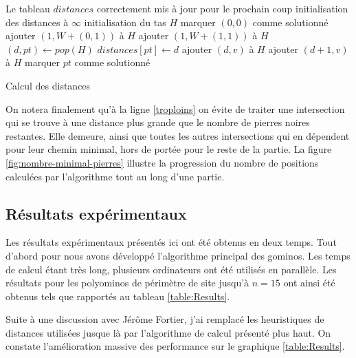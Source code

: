 \begin{algorithm}
\fontsize{10}{10}\selectfont
\begin{algorithmic}[1]
\Ensure Le tableau $distances$ correctement mis à jour pour le prochain coup
\State initialisation des distances à $\infty$
\State initialisation du tas $H$
\State marquer $(0,0)$ comme solutionné
\State ajouter $(1, W+(0,1))$ à $H$
\State ajouter $(1, W+(1,1))$ à $H$
	\State $(d, pt) \gets pop(H)$ \label{pop}
		\State $distances[pt] \gets d$
				\State ajouter $(d, v)$ à $H$
			\label{troploins}
				\State ajouter $(d+1, v)$ à $H$
			\EndIf
		\EndFor
		\State marquer $pt$ comme solutionné
	\EndIf
\EndWhile
\EndProcedure
\end{algorithmic}
\caption{Calcul des distances}\label{algo:calcul-des-distances}
\end{algorithm}


On notera finalement qu'à la ligne \ref{troploins} on évite de traiter une intersection qui se trouve à une distance plus grande que le nombre de pierres noires restantes. Elle demeure, ainsi que toutes les autres intersections qui en dépendent pour leur chemin minimal, hors de portée pour le reste de la partie. La figure \ref{fig:nombre-minimal-pierres} illustre la progression du nombre de positions calculées par l'algorithme tout au long d'une partie.

\subsection{Résultats expérimentaux}

Les résultats expérimentaux présentés ici ont été obtenus en deux temps. Tout d'abord pour \cite{FGLT} nous avons développé l'algorithme principal des gominos. Les temps de calcul étant très long, plusieurs ordinateurs ont été utilisés en parallèle. Les résultats pour les polyominos de périmètre de site jusqu'à $n=15$ ont ainsi été obtenus tels que rapportés au tableau \ref{table:Results}.

Suite à une discussion avec Jérôme Fortier, j'ai remplacé les heuristiques de distances utilisées jusque là par l'algorithme de calcul présenté plus haut. On constate l'amélioration massive des performance sur le graphique \ref{table:Results}.

